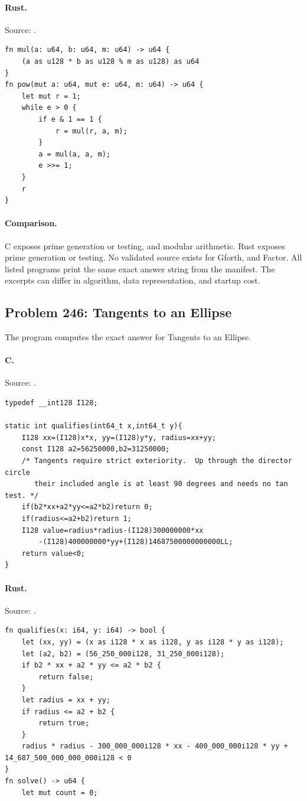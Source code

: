 \paragraph{Rust.} Source: .
\begin{lstlisting}
fn mul(a: u64, b: u64, m: u64) -> u64 {
    (a as u128 * b as u128 % m as u128) as u64
}
fn pow(mut a: u64, mut e: u64, m: u64) -> u64 {
    let mut r = 1;
    while e > 0 {
        if e & 1 == 1 {
            r = mul(r, a, m);
        }
        a = mul(a, a, m);
        e >>= 1;
    }
    r
}
\end{lstlisting}

\paragraph{Comparison.}
C exposes prime generation or testing, and modular arithmetic. Rust exposes prime generation or testing.
No validated source exists for Gforth, and Factor.
All listed programs print the same exact answer string from the manifest. The excerpts can differ in algorithm, data representation, and startup cost.

\subsection{Problem 246: Tangents to an Ellipse}
\label{walkthrough:p246}
The program computes the exact answer for Tangents to an Ellipse.

\paragraph{C.} Source: .
\begin{lstlisting}
typedef __int128 I128;

static int qualifies(int64_t x,int64_t y){
    I128 xx=(I128)x*x, yy=(I128)y*y, radius=xx+yy;
    const I128 a2=56250000,b2=31250000;
    /* Tangents require strict exteriority.  Up through the director circle
       their included angle is at least 90 degrees and needs no tan test. */
    if(b2*xx+a2*yy<=a2*b2)return 0;
    if(radius<=a2+b2)return 1;
    I128 value=radius*radius-(I128)300000000*xx
        -(I128)400000000*yy+(I128)14687500000000000LL;
    return value<0;
}
\end{lstlisting}

\paragraph{Rust.} Source: .
\begin{lstlisting}
fn qualifies(x: i64, y: i64) -> bool {
    let (xx, yy) = (x as i128 * x as i128, y as i128 * y as i128);
    let (a2, b2) = (56_250_000i128, 31_250_000i128);
    if b2 * xx + a2 * yy <= a2 * b2 {
        return false;
    }
    let radius = xx + yy;
    if radius <= a2 + b2 {
        return true;
    }
    radius * radius - 300_000_000i128 * xx - 400_000_000i128 * yy + 14_687_500_000_000_000i128 < 0
}
fn solve() -> u64 {
    let mut count = 0;
\end{lstlisting}

